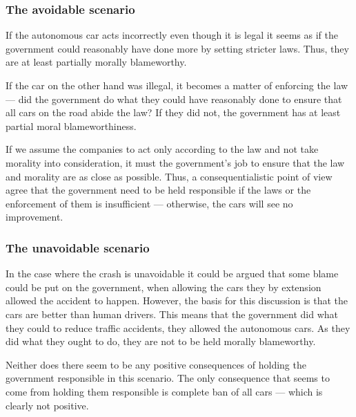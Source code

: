 \subsubsection{The avoidable scenario}
If the autonomous car acts incorrectly even though it is legal it seems as if
the government could reasonably have done more by setting stricter laws. Thus,
they are at least partially morally blameworthy.

If the car on the other hand was illegal, it becomes a matter of enforcing the
law --- did the government do what they could have reasonably done to ensure
that all cars on the road abide the law? If they did not, the government has at
least partial moral blameworthiness.

If we assume the companies to act only according to the law and not take
morality into consideration, it must the government's job to ensure that the law
and morality are as close as possible. Thus, a consequentialistic point of view
agree that the government need to be held responsible if the laws or the
enforcement of them is insufficient --- otherwise, the cars will see no
improvement.

\subsubsection{The unavoidable scenario}
In the case where the crash is unavoidable it could be argued that some blame
could be put on the government, when allowing the cars they by extension allowed
the accident to happen. However, the basis for this discussion is that the cars
are better than human drivers. This means that the government did what they
could to reduce traffic accidents, they allowed the autonomous cars. As they did
what they ought to do, they are not to be held morally blameworthy.

Neither does there seem to be any positive consequences of holding the
government responsible in this scenario. The only consequence that seems to come
from holding them responsible is complete ban of all cars --- which is clearly
not positive.
